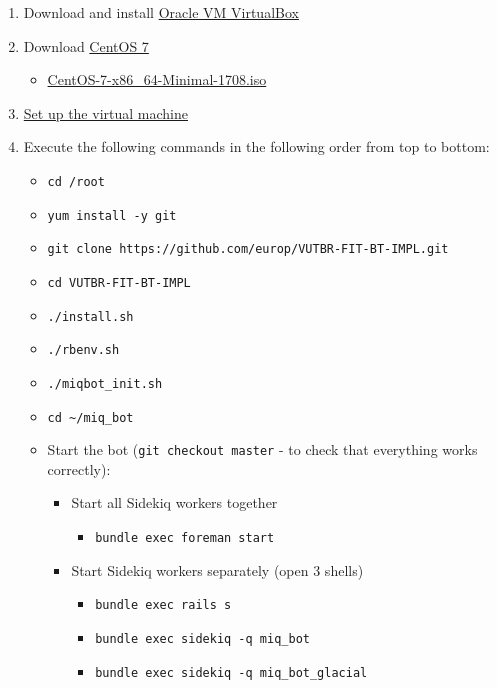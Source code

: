 \begin{enumerate}
\def\labelenumi{\arabic{enumi}.}
\tightlist
\item
  Download and install \href{https://www.virtualbox.org/}{Oracle VM
  VirtualBox}
\item
  Download \href{https://www.centos.org/}{CentOS 7}

  \begin{itemize}
  \tightlist
  \item
    \href{http://isoredirect.centos.org/centos/7/isos/x86_64/CentOS-7-x86_64-Minimal-1708.iso}{CentOS-7-x86\_64-Minimal-1708.iso}
  \end{itemize}
\item
  \href{https://github.com/europ/VUTBR-FIT-BT-IMPL/blob/master/VM_SETUP.md}{Set
  up the virtual machine}
\item
  Execute the following commands in the following order from top to
  bottom:

  \begin{itemize}
  \tightlist
  \item
    \texttt{cd\ /root}
  \item
    \texttt{yum\ install\ -y\ git}
  \item
    \texttt{git\ clone\ https://github.com/europ/VUTBR-FIT-BT-IMPL.git}
  \item
    \texttt{cd\ VUTBR-FIT-BT-IMPL}
  \item
    \texttt{./install.sh}
  \item
    \texttt{./rbenv.sh}
  \item
    \texttt{./miqbot\_init.sh}
  \item
    \texttt{cd\ \textasciitilde{}/miq\_bot}
  \item
    Start the bot (\texttt{git\ checkout\ master} - to check that
    everything works correctly):

    \begin{itemize}
    \tightlist
    \item
      Start all Sidekiq workers together

      \begin{itemize}
      \tightlist
      \item
        \texttt{bundle\ exec\ foreman\ start}
      \end{itemize}
    \item
      Start Sidekiq workers separately (open 3 shells)

      \begin{itemize}
      \tightlist
      \item
        \texttt{bundle\ exec\ rails\ s}
      \item
        \texttt{bundle\ exec\ sidekiq\ -q\ miq\_bot}
      \item
        \texttt{bundle\ exec\ sidekiq\ -q\ miq\_bot\_glacial}
      \end{itemize}
    \end{itemize}
  \end{itemize}
\end{enumerate}

